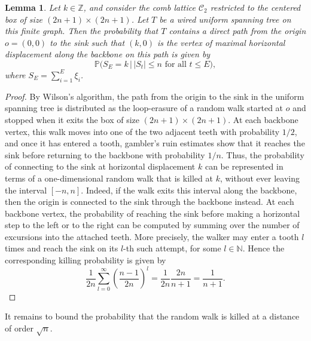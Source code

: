 \documentclass[11pt]{article}
\newtheorem{lemma}{Lemma}[section]
\begin{document}
\begin{lemma}\label{lem:direct_path}
Let $k\in\mathbb{Z}$, and consider the comb lattice $\mathcal{C}_2$ restricted to the centered box of size $(2n+1)\times(2n+1)$. Let $T$ be a wired uniform spanning tree on this finite graph. Then the probability that $T$ contains a direct path from the origin $o=(0,0)$ to the sink such that $(k,0)$ is the vertex of maximal horizontal displacement along the backbone on this path is given by
$$
\mathbb{P}\bigl(S_E=k \,\big|\, |S_t|\leq n \text{ for all } t\leq E\bigr),
$$
where $S_E=\sum_{i=1}^E \xi_i$.
\end{lemma}

\begin{proof}
    By Wilson’s algorithm, the path from the origin to the sink in the uniform spanning tree is distributed as the loop-erasure of a random walk started at $o$ and stopped when it exits the box of size $(2n+1)\times(2n+1)$. At each backbone vertex, this walk moves into one of the two adjacent teeth with probability $1/2$, and once it has entered a tooth, gambler’s ruin estimates show that it reaches the sink before returning to the backbone with probability $1/n$.
    Thus, the probability of connecting to the sink at horizontal displacement $k$ can be represented in terms of a one-dimensional random walk that is killed at $k$, without ever leaving the interval $[-n,n]$. Indeed, if the walk exits this interval along the backbone, then the origin is connected to the sink through the backbone instead. At each backbone vertex, the probability of reaching the sink before making a horizontal step to the left or to the right can be computed by summing over the number of excursions into the attached teeth. More precisely, the walker may enter a tooth $l$ times and reach the sink on its $l$-th such attempt, for some $l\in\mathbb{N}$. Hence the corresponding killing probability is given by
    $$\frac{1}{2n}\sum_{l=0}^\infty \left(\frac{n-1}{2n}\right)^l=\frac{1}{2n}\frac{2n}{n+1}=\frac{1}{n+1}.$$
\end{proof}
It remains to bound the probability that the random walk is killed at a distance of order $\sqrt{n}$.
\end{document}
